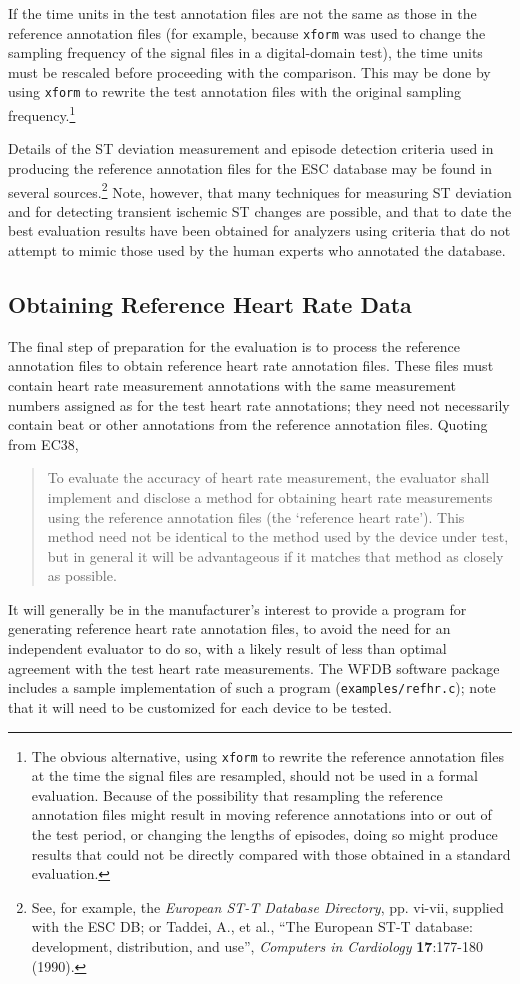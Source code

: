 \documentclass[twoside]{article}
\begin{document}
If the time units in the test annotation files are not the same as those in
the reference annotation files (for example, because {\tt xform} was used to
change the sampling frequency of the signal files in a digital-domain test),
the time units must be rescaled before proceeding with the comparison.  This
may be done by using {\tt xform} to rewrite the test annotation files with
the original sampling frequency.\footnote{
The obvious alternative, using {\tt xform} to rewrite the reference annotation
files at the time the signal files are resampled, should not be used in a
formal evaluation.  Because of the possibility that resampling the reference
annotation files might result in moving reference annotations into or out of
the test period, or changing the lengths of episodes, doing so might produce
results that could not be directly compared with those obtained in a standard
evaluation.}

Details of the ST deviation measurement and episode detection criteria used in
producing the reference annotation files for the ESC database may be found in
several sources.\footnote{ See, for example, the {\it European ST-T Database
Directory}, pp. vi-vii, supplied with the ESC DB; or Taddei, A., et al., ``The
European ST-T database: development, distribution, and use'', {\it Computers
in Cardiology} {\bf 17}:177-180 (1990).} Note, however, that many techniques
for measuring ST deviation and for detecting transient ischemic ST changes are
possible, and that to date the best evaluation results have been obtained for
analyzers using criteria that do not attempt to mimic those used by the human
experts who annotated the database.

\subsection{Obtaining Reference Heart Rate Data}
The final step of preparation for the evaluation is to process the
reference annotation files to obtain reference heart rate annotation
files.  These files must contain heart rate measurement annotations
with the same measurement numbers assigned as for the test heart rate
annotations; they need not necessarily contain beat or other
annotations from the reference annotation files.  Quoting from EC38,
\begin{quote}
To evaluate the accuracy of heart rate measurement, the evaluator
shall implement and disclose a method for obtaining heart rate
measurements using the reference annotation files (the `reference
heart rate').  This method need not be identical to the method used by
the device under test, but in general it will be advantageous if it
matches that method as closely as possible.
\end{quote}
It will generally be in the manufacturer's interest to provide a
program for generating reference heart rate annotation files, to avoid
the need for an independent evaluator to do so, with a likely result
of less than optimal agreement with the test heart rate measurements.
The WFDB software package includes a sample implementation of such a
program ({\tt examples/refhr.c}); note that it will need to be
customized for each device to be tested.
\end{document}
